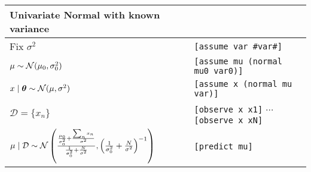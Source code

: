 \begin{table}[h]
\begin{tabular}{ll}
\toprule
Univariate Normal with known variance & \\
\midrule
Fix $\sigma^2$																		& \texttt{[assume var \#var\#]} \\
$\mu \sim \operatorname{\mathcal N}(\mu_0, \sigma_0^2)$												& \texttt{[assume mu (normal mu0 var0)]} \\
$x \mid \boldsymbol{\mathbf{\theta}} \sim \operatorname{\mathcal N}(\mu, \sigma^2)$										& \texttt{[assume x (normal mu var)]} \\
$\mathcal D = \{x_n\}$																& \texttt{[observe x x1]} $\cdots$ \texttt{[observe x xN]} \\
$\mu \mid \mathcal D \sim \operatorname{\mathcal N}\left(\frac{\frac{\mu_0}{\sigma_0^2} + \frac{\sum_n x_n}{\sigma^2}}{\frac{1}{\sigma_0^2} + \frac{N}{\sigma^2}}, \left(\frac{1}{\sigma_0^2} + \frac{N}{\sigma^2}\right)^{-1}\right)$		& \texttt{[predict mu]} \\
\bottomrule
\end{tabular}
\end{table}

